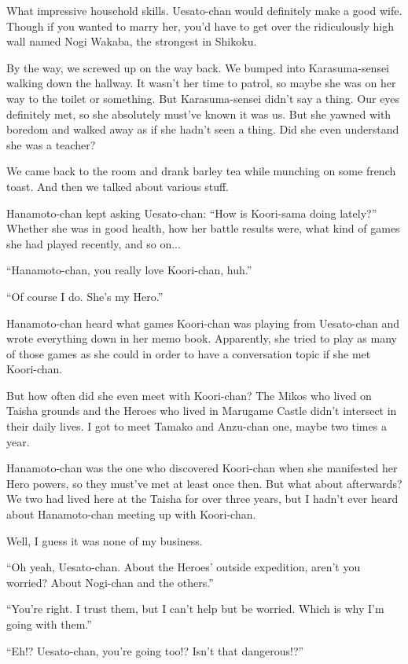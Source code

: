 What impressive household skills. Uesato-chan would definitely make a good wife. Though if you wanted to marry her, you'd have to get over the ridiculously high wall named Nogi Wakaba, the strongest in Shikoku.

By the way, we screwed up on the way back. We bumped into Karasuma-sensei walking down the hallway. It wasn't her time to patrol, so maybe she was on her way to the toilet or something. But Karasuma-sensei didn't say a thing. Our eyes definitely met, so she absolutely must've known it was us. But she yawned with boredom and walked away as if she hadn't seen a thing. Did she even understand she was a teacher?

We came back to the room and drank barley tea while munching on some french toast. And then we talked about various stuff.

Hanamoto-chan kept asking Uesato-chan: ``How is Koori-sama doing lately?'' Whether she was in good health, how her battle results were, what kind of games she had played recently, and so on...

``Hanamoto-chan, you really love Koori-chan, huh.''

``Of course I do. She's my Hero.''

Hanamoto-chan heard what games Koori-chan was playing from Uesato-chan and wrote everything down in her memo book. Apparently, she tried to play as many of those games as she could in order to have a conversation topic if she met Koori-chan.

But how often did she even meet with Koori-chan? The Mikos who lived on Taisha grounds and the Heroes who lived in Marugame Castle didn't intersect in their daily lives. I got to meet Tamako and Anzu-chan one, maybe two times a year.

Hanamoto-chan was the one who discovered Koori-chan when she manifested her Hero powers, so they must've met at least once then. But what about afterwards? We two had lived here at the Taisha for over three years, but I hadn't ever heard about Hanamoto-chan meeting up with Koori-chan.

Well, I guess it was none of my business.

``Oh yeah, Uesato-chan. About the Heroes' outside expedition, aren't you worried? About Nogi-chan and the others.''

``You're right. I trust them, but I can't help but be worried. Which is why I'm going with them.''

``Eh!? Uesato-chan, you're going too!? Isn't that dangerous!?''

